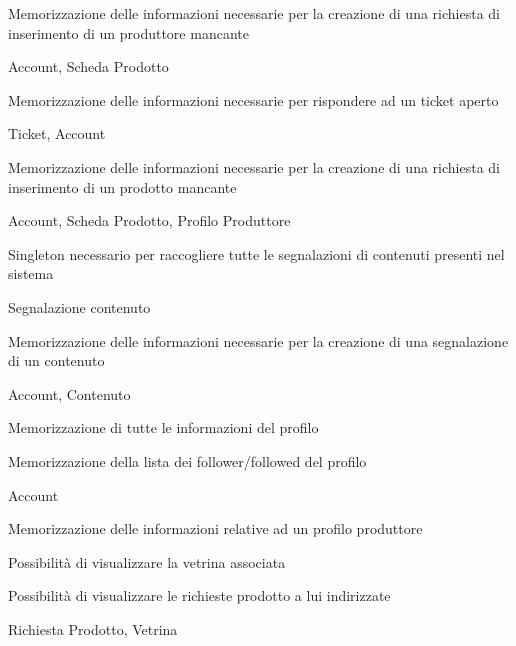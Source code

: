 
{\begin{itemWork}
	\item Memorizzazione delle informazioni necessarie per la creazione di una richiesta di inserimento di un produttore mancante
\end{itemWork}}
{Account, Scheda Prodotto}



{\begin{itemWork}
	\item Memorizzazione delle informazioni necessarie per rispondere ad un ticket aperto
\end{itemWork}}
{Ticket, Account}


{\begin{itemWork}
	\item Memorizzazione delle informazioni necessarie per la creazione di una richiesta di inserimento di un prodotto mancante
\end{itemWork}}
{Account, Scheda Prodotto, Profilo Produttore}


{\begin{itemWork}
	\item Singleton necessario per raccogliere tutte le segnalazioni di contenuti presenti nel sistema
\end{itemWork}}
{Segnalazione contenuto}


{\begin{itemWork}
	\item Memorizzazione delle informazioni necessarie per la creazione di una segnalazione di un contenuto
\end{itemWork}}
{Account, Contenuto}


{\begin{itemWork}
	\item Memorizzazione di tutte le informazioni del profilo
	\item Memorizzazione della lista dei follower/followed del profilo
\end{itemWork}}
{Account}


{\begin{itemWork}
	\item Memorizzazione delle informazioni relative ad un profilo produttore
	\item Possibilità di visualizzare la vetrina associata
	\item Possibilità di visualizzare le richieste prodotto a lui indirizzate
\end{itemWork}}
{Richiesta Prodotto, Vetrina}

